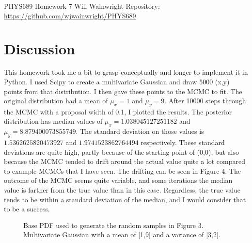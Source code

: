 \documentclass[twocolumn,11pt]{article}
\begin{document}
\pagestyle{plain}
\onecolumn
PHYS689 
\newline Homework 7
\newline Will Wainwright
\newline Repository: \href{https://github.com/wjwainwright/PHYS689}{https://github.com/wjwainwright/PHYS689}

\section*{Discussion}
This homework took me a bit to grasp conceptually and longer to implement it in Python. I used Scipy to create a multivariate Gaussian and draw 5000 (x,y) points from that distribution. I then gave these points to the MCMC to fit. The original distribution had a mean of $\mu_x = 1$ and $\mu_y = 9$. After 10000 steps through the MCMC with a proposal width of 0.1, I plotted the results. The posterior distribution has median values of $\mu_x = 1.038045127251182$ and $\mu_y = 8.879400073855749$. The standard deviation on those values is $1.5362625820473927$ and $1.9741523862764494$ respectively. These standard deviations are quite high, partly because of the starting point of (0,0), but also because the MCMC tended to drift around the actual value quite a lot compared to example MCMCs that I have seen. The drifting can be seen in Figure 4. The outcome of the MCMC seems quite variable, and some iterations the median value is farther from the true value than in this case. Regardless, the true value tends to be within a standard deviation of the median, and I would consider that to be a success.

\begin{figure}[!h]
	\centering
	\noindent
      \caption{Base PDF used to generate the random samples in Figure 3. Multivariate Gaussian with a mean of [1,9] and a variance of [3,2].}
\end{figure}
\end{document}
